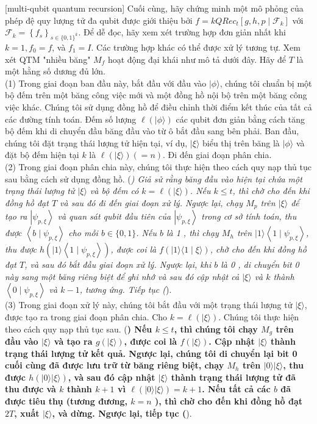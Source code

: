 \documentclass[10pt]{article}
\begin{document}
[multi-qubit quantum recursion] Cuối cùng, hãy chứng minh một mô phỏng của phép đệ quy lượng tử đa qubit được giới thiệu bởi $f=k Q R e c_{t}\left[g, h, p \mid \mathcal{F}_{k}\right]$ với $\mathcal{F}_{k}=\left\{f_{s}\right\}_{s \in\{0,1\}^{k}}$. Để dễ đọc, hãy xem xét trường hợp đơn giản nhất khi $k=1, f_{0}=f$, và $f_{1}=I$. Các trường hợp khác có thể được xử lý tương tự. Xem xét QTM "nhiều băng" $M_{f}$ hoạt động đại khái như mô tả dưới đây. Hãy để $T$ là một hằng số dương đủ lớn.\\
(1) Trong giai đoạn ban đầu này, bắt đầu với đầu vào $|\phi\rangle$, chúng tôi chuẩn bị một bộ đếm trên một băng công việc mới và một đồng hồ nội bộ trên một băng công việc khác. Chúng tôi sử dụng đồng hồ để điều chỉnh thời điểm kết thúc của tất cả các đường tính toán. Đếm số lượng $\ell(|\phi\rangle)$ các qubit đơn giản bằng cách tăng bộ đếm khi di chuyển đầu băng đầu vào từ ô bắt đầu sang bên phải. Ban đầu, chúng tôi đặt trạng thái lượng tử hiện tại, ví dụ, $|\xi\rangle$ biểu thị trên băng là $|\phi\rangle$ và đặt bộ đếm hiện tại $k$ là $\ell(|\xi\rangle)(=n)$. Đi đến giai đoạn phân chia.\\
(2) Trong giai đoạn phân chia này, chúng tôi thực hiện theo cách quy nạp thủ tục sau bằng cách sử dụng đồng hồ. (\textit{) Giả sử rằng băng đầu vào hiện tại chứa một trạng thái lượng tử $|\xi\rangle$ và bộ đếm có $k=\ell(|\xi\rangle)$. Nếu $k \leq t$, thì chờ cho đến khi đồng hồ đạt $T$ và sau đó đi đến giai đoạn xử lý. Ngược lại, chạy $M_{p}$ trên $|\xi\rangle$ để tạo ra $\left|\psi_{p, \xi}\right\rangle$ và quan sát qubit đầu tiên của $\left|\psi_{p, \xi}\right\rangle$ trong cơ sở tính toán, thu được $\left\langle b \mid \psi_{p, \xi}\right\rangle$ cho mỗi $b \in\{0,1\}$. Nếu $b$ là 1 , thì chạy $M_{h}$ trên $|1\rangle\left\langle 1 \mid \psi_{p, \xi}\right\rangle$, thu được $h\left(|1\rangle\left\langle 1 \mid \psi_{p, \xi}\right\rangle\right)$, được coi là $f(|1\rangle\langle 1 \mid \xi\rangle)$, chờ cho đến khi đồng hồ đạt $T$, và sau đó bắt đầu giai đoạn xử lý. Ngược lại, khi $b$ là 0 , di chuyển bit 0 này sang một băng riêng biệt để ghi nhớ và sau đó cập nhật cả $|\xi\rangle$ và $k$ thành $\left\langle 0 \mid \psi_{p, \xi}\right\rangle$ và $k-1$, tương ứng. Tiếp tục (}).\\
(3) Trong giai đoạn xử lý này, chúng tôi bắt đầu với một trạng thái lượng tử $|\xi\rangle$, được tạo ra trong giai đoạn phân chia. Cho $k=\ell(|\xi\rangle)$. Chúng tôi thực hiện theo cách quy nạp thủ tục sau. (\textbf{) Nếu $k \leq t$, thì chúng tôi chạy $M_{g}$ trên đầu vào $|\xi\rangle$ và tạo ra $g(|\xi\rangle)$, được coi là $f(|\xi\rangle)$. Cập nhật $|\xi\rangle$ thành trạng thái lượng tử kết quả. Ngược lại, chúng tôi di chuyển lại bit 0 cuối cùng đã được lưu trữ từ băng riêng biệt, chạy $M_{h}$ trên $|0\rangle|\xi\rangle$, thu được $h(|0\rangle|\xi\rangle)$, và sau đó cập nhật $|\xi\rangle$ thành trạng thái lượng tử đã thu được và $k$ thành $k+1$ vì $\ell(|0\rangle|\xi\rangle)=k+1$. Nếu tất cả các $b$ đã được tiêu thụ (tương đương, $k=n$ ), thì chờ cho đến khi đồng hồ đạt $2 T$, xuất $|\xi\rangle$, và dừng. Ngược lại, tiếp tục (}).
\end{document}
